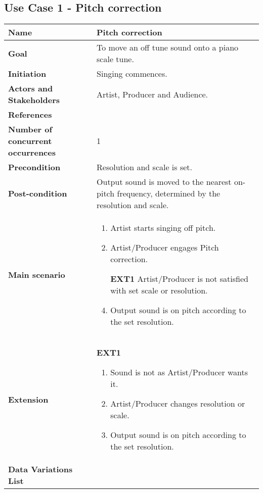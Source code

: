 \subsection{Use Case 1 - Pitch correction}
\begin{table}[H]
	\centering
	\begin{tabularx}{\textwidth}{p{} X}
		\toprule
		\textbf{Name} & Pitch correction \\
		\midrule
		\textbf{Goal} & To move an off tune sound onto a piano scale tune. \\
		\midrule
		\textbf{Initiation} & Singing commences.\\
		\midrule
		\textbf{Actors and Stakeholders} & Artist, Producer and Audience. \\
		\midrule
		\textbf{References} & \\
		\midrule
		\textbf{Number of concurrent occurrences} & 1 \\
		\midrule
		\textbf{Precondition} & Resolution and scale is set. \\
		\midrule
		\textbf{Post-condition} & Output sound is moved to the nearest on-pitch frequency, determined by the resolution and scale. \\
		\midrule
		\textbf{Main scenario} & 
		\begin{enumerate}[noitemsep, topsep=0pt]
			\item Artist starts singing off pitch.
			\item Artist/Producer engages Pitch correction.
			\item[\textbf{EXT1}] Artist/Producer is not satisfied with set scale or resolution.
			\item Output sound is on pitch according to the set resolution.
		\end{enumerate}
		\\
		\midrule
		\textbf{Extension} & 
		\textbf{EXT1}
		\begin{enumerate}[noitemsep, topsep=0pt]
			\item Sound is not as Artist/Producer wants it.
			\item Artist/Producer changes resolution or scale.
			\item Output sound is on pitch according to the set resolution.
		\end{enumerate}
		\\
		\midrule
		\textbf{Data Variations List} & \\
		\bottomrule
	\end{tabularx}
\end{table}

